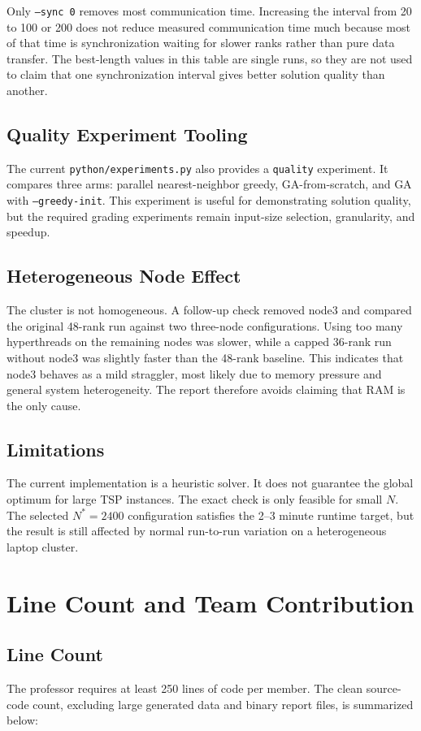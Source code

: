 \documentclass[11pt,a4paper]{article}
\begin{document}
Only \texttt{--sync 0} removes most communication time. Increasing the interval
from 20 to 100 or 200 does not reduce measured communication time much because
most of that time is synchronization waiting for slower ranks rather than pure
data transfer. The best-length values in this table are single runs, so they are
not used to claim that one synchronization interval gives better solution
quality than another.

\subsection{Quality Experiment Tooling}
The current \texttt{python/experiments.py} also provides a \texttt{quality}
experiment. It compares three arms: parallel nearest-neighbor greedy,
GA-from-scratch, and GA with \texttt{--greedy-init}. This experiment is useful
for demonstrating solution quality, but the required grading experiments remain
input-size selection, granularity, and speedup.

\subsection{Heterogeneous Node Effect}
The cluster is not homogeneous. A follow-up check removed node3 and compared
the original 48-rank run against two three-node configurations. Using too many
hyperthreads on the remaining nodes was slower, while a capped 36-rank run
without node3 was slightly faster than the 48-rank baseline. This indicates that
node3 behaves as a mild straggler, most likely due to memory pressure and
general system heterogeneity. The report therefore avoids claiming that RAM is
the only cause.

\subsection{Limitations}
The current implementation is a heuristic solver. It does not guarantee the
global optimum for large TSP instances. The exact check is only feasible for
small $N$. The selected $N^*=2400$ configuration satisfies the 2--3 minute
runtime target, but the result is still affected by normal run-to-run variation
on a heterogeneous laptop cluster.
\newpage

\section{Line Count and Team Contribution}

\subsection{Line Count}
The professor requires at least 250 lines of code per member. The clean
source-code count, excluding large generated data and binary report files, is
summarized below:
\end{document}
